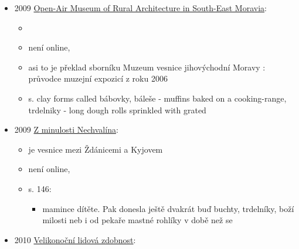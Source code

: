 \begin{itemize}
  \begin{itemize}
  \tightlist
  \item
  \item
    není online,
  \item
    s. 60: tradice -\/- některé výrobky se ozačují jako tradiční a pak
    se prodávají jako prémiový nebo luxusní. Je možno vzpomenout třeba
    vzkříšení automobilové značky Maybach nebo stánkový prodej
    „tradičního`` trdelníku, o němž veřejnost před deseti lety neměla
    ani ponětí
  \end{itemize}
\item
  2009
  \href{https://www.digitalniknihovna.cz/mzk/uuid/uuid:387fa680-4e1f-11e4-ab76-005056827e51}{Open-Air
  Museum of Rural Architecture in South-East Moravia}:

  \begin{itemize}
  \tightlist
  \item
  \item
    není online, 
  \item
    asi to je překlad sborníku Muzeum vesnice jihovýchodní Moravy :
    průvodce muzejní expozicí z roku 2006
  \item
    s. clay forms called bábovky, báleše - muffins baked on a
    cooking-range, trdelniky - long dough rolls sprinkled with grated
  \end{itemize}
\item
  2009
  \href{https://ndk.cz/uuid/uuid:1cb4fbce-a793-11f1-ad60-b2c04664ca9b}{Z
  minulosti Nechvalína}:

  \begin{itemize}
  \tightlist
  \item
     je vesnice mezi Ždánicemi a Kyjovem
  \item
    není online, 
  \item
    s. 146:

    \begin{itemize}
    \tightlist
    \item
      mamince dítěte. Pak donesla ještě dvakrát buď buchty, trdelníky,
      boží milosti neb i od pekaře mastné rohlíky v době než se
    \end{itemize}
  \end{itemize}
\item
  2010
  \href{https://ceskadigitalniknihovna.cz/uuid/uuid:553c58c0-69fe-11eb-9f97-005056827e51}{Velikonoční
  lidová zdobnost}:


\end{itemize}
